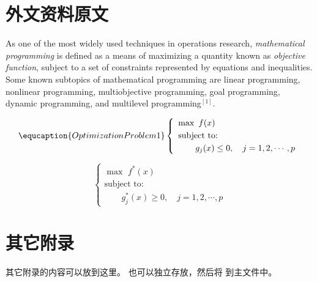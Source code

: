 
\chapter{外文资料原文}
\label{chap:appx:1}
As one of the most widely used techniques in operations research, {\em mathematical programming} is defined as a means of maximizing a quantity known as {\em objective function}, subject to a set of constraints represented by equations and inequalities.
Some known subtopics of mathematical programming are linear programming, nonlinear programming, multiobjective programming, goal programming, dynamic programming, and multilevel programming$^{[1]}$.


\begin{equation} \equcaption{Optimization Problem 1} %
    \left\{ \begin{array}{l}
        \max \,\,f(x)      \\ [0.1 cm]
        \mbox{subject to:} \\ [0.1 cm]
        \qquad g_j(x)\le 0, \quad j=1,2,\cdots,p
    \end{array} \right.
\end{equation}

\begin{equation}
    \left\{ \begin{array}{l}
        \max \,\,f^\ast(x) \\ [0.1 cm]
        \mbox{subject to:} \\ [0.1 cm]
        \qquad g_j^\ast(x)\ge 0, \quad j=1,2,\cdots,p
    \end{array} \right.
\end{equation}

\chapter{其它附录}
\label{chap:appx:2}
其它附录的内容可以放到这里。
也可以独立存放，然后将 \verb|| 到主文件中。
